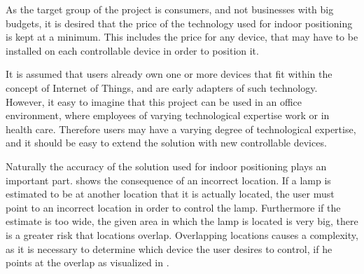 As the target group of the project is consumers, 
and not businesses with big budgets, 
it is desired that the price of the technology used for indoor positioning is kept at a minimum. 
This includes the price for any device, 
that may have to be installed on each controllable device in order to position it.

It is assumed that users already own one or more devices that fit within the concept of Internet of Things, 
and are early adapters of such technology. 
However, it easy to imagine that this project can be used in an office environment, 
where employees of varying technological expertise work or in health care. 
Therefore users may have a varying degree of technological expertise, 
and it should be easy to extend the solution with new controllable devices.

Naturally the accuracy of the solution used for indoor positioning plays an important part. 
 shows the consequence of an incorrect location. 
If a lamp is estimated to be at another location that it is actually located, 
the user must point to an incorrect location in order to control the lamp.
Furthermore if the estimate is too wide, 
\ie the given area in which the lamp is located is very big, 
there is a greater risk that locations overlap. 
Overlapping locations causes a complexity, 
as it is necessary to determine which device the user desires to control, 
if he points at the overlap as visualized in .

